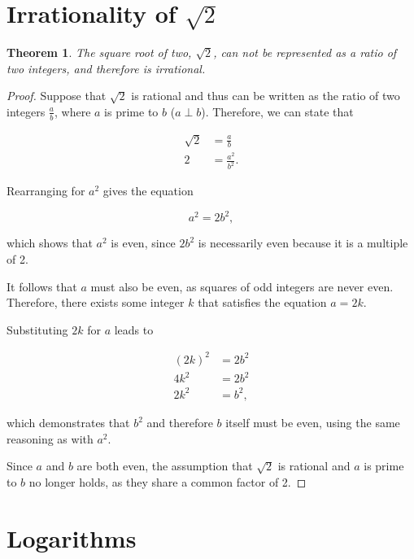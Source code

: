 \documentclass[parskip]{scrartcl}
\newtheorem{theorem}{Theorem}
\begin{document}
\section{Irrationality of \(\sqrt{2}\)}

\begin{theorem}
  The square root of two, \(\sqrt{2}\), can not be represented as a ratio of two
  integers, and therefore is irrational.
\end{theorem}

\begin{proof}
  Suppose that \(\sqrt{2}\) is rational and thus can be written as the ratio of
  two integers \(\frac{a}{b}\), where \(a\) is prime to \(b\) (\(a ⟂
  b\)). Therefore, we can state that

  \begin{align*}
    \sqrt{2} &= \frac{a}{b} \\
    2 &= \frac{a^2}{b^2}.
  \end{align*}

  Rearranging for \(a^2\) gives the equation

  \begin{equation*}
    a^2 = 2b^2,
  \end{equation*}

  which shows that \(a^2\) is even, since \(2b^2\) is necessarily even because
  it is a multiple of 2.

  It follows that \(a\) must also be even, as squares of odd integers are never
  even. Therefore, there exists some integer \(k\) that satisfies the equation
  \(a = 2k\).

  Substituting \(2k\) for \(a\) leads to

  \begin{align*}
    {(2k)}^2 &= 2b^2 \\
    4k^2 &= 2b^2 \\
    2k^2 &= b^2,
  \end{align*}

  which demonstrates that \(b^2\) and therefore \(b\) itself must be even, using
  the same reasoning as with \(a^2\).

  Since \(a\) and \(b\) are both even, the assumption that \(\sqrt{2}\) is
  rational and \(a\) is prime to \(b\) no longer holds, as they share a common
  factor of 2.
\end{proof}

\section{Logarithms}
\end{document}
